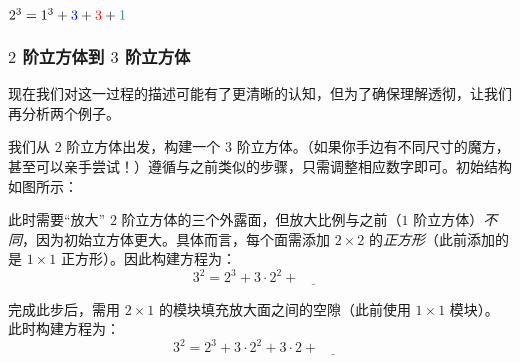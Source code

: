 \begin{center}
    \large $2^3 = 1^3+\textcolor{blue}{3}+\textcolor{red}{3}+\textcolor{olivegreen}{1}$
\end{center}

\subsubsection*{$2$ 阶立方体到 $3$ 阶立方体}

现在我们对这一过程的描述可能有了更清晰的认知，但为了确保理解透彻，让我们再分析两个例子。

我们从 $2$ 阶立方体出发，构建一个 $3$ 阶立方体。（如果你手边有不同尺寸的魔方，甚至可以亲手尝试！）遵循与之前类似的步骤，只需调整相应数字即可。初始结构如图所示：

\begin{center}
\end{center}

此时需要``放大'' $2$ 阶立方体的三个外露面，但放大比例与之前（$1$ 阶立方体）\emph{不同}，因为初始立方体更大。具体而言，每个面需添加 $2 \times 2$ 的\emph{正方形}（此前添加的是 $1 \times 1$ 正方形）。因此构建方程为：
\[3^2 = 2^3+3\cdot2^2+\underline{\qquad}\]

\begin{center}
\end{center}

完成此步后，需用 $2 \times 1$ 的模块填充放大面之间的空隙（此前使用 $1 \times 1$ 模块）。此时构建方程为：
\[3^2 = 2^3+3\cdot2^2+3\cdot2+\underline{\qquad}\]

